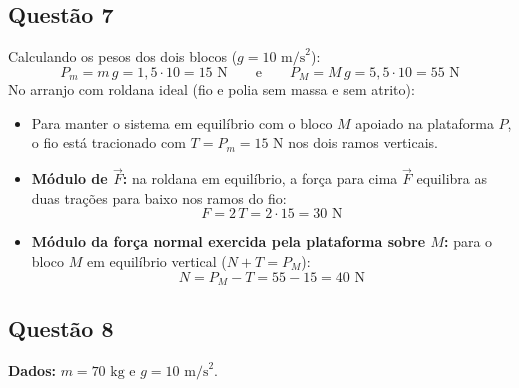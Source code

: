 \documentclass[11pt, a4paper]{article}
\begin{document}
\subsection*{Questão 7}
Calculando os pesos dos dois blocos ($g = 10\text{ m/s}^2$):
\[
    P_m = m\,g = 1{,}5 \cdot 10 = 15\text{ N} \qquad \text{e} \qquad P_M = M\,g = 5{,}5 \cdot 10 = 55\text{ N}
\]
No arranjo com roldana ideal (fio e polia sem massa e sem atrito):
\begin{itemize}
    \item Para manter o sistema em equilíbrio com o bloco $M$ apoiado na plataforma $P$, o fio está tracionado com $T = P_m = 15\text{ N}$ nos dois ramos verticais.
    \item \textbf{Módulo de $\vec{F}$:} na roldana em equilíbrio, a força para cima $\vec{F}$ equilibra as duas trações para baixo nos ramos do fio:
    \[
        F = 2\,T = 2 \cdot 15 = 30\text{ N}
    \]
    \item \textbf{Módulo da força normal exercida pela plataforma sobre $M$:} para o bloco $M$ em equilíbrio vertical ($N + T = P_M$):
    \[
        N = P_M - T = 55 - 15 = 40\text{ N}
    \]
\end{itemize}

\subsection*{Questão 8}
\textbf{Dados:} $m = 70\text{ kg}$ e $g = 10\text{ m/s}^2$.
\end{document}

